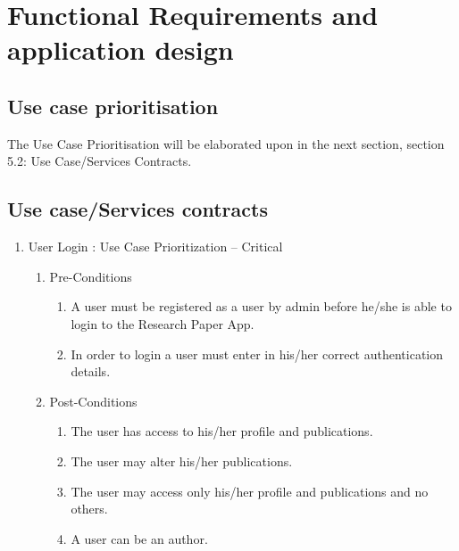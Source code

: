 \documentclass[hidelinks,a4paper,12pt]{article}
\begin{document}
\section{Functional Requirements and application design}
	\subsection{Use case prioritisation}
	The Use Case Prioritisation will be elaborated upon in the next section, section 5.2: Use Case/Services Contracts.
\subsection{ Use case/Services contracts}

\begin{enumerate}
	\item  User Login : Use Case Prioritization -- Critical
	\begin{enumerate}
		\item  Pre-Conditions
		\begin{enumerate}
			\item  A user must be registered as a user by admin before he/she is able to login to the Research Paper App.
			\item  In order to login a user must enter in his/her correct authentication details.
		\end{enumerate}
		\item  Post-Conditions
		\begin{enumerate}
			\item  The user has access to his/her profile and publications.
			\item  The user may alter his/her publications.
			\item  The user may access only his/her profile and publications and no others.
			\item  A user can be an author.
		\end{enumerate}
	\end{enumerate}
\end{enumerate}

\noindent 
\end{document}
